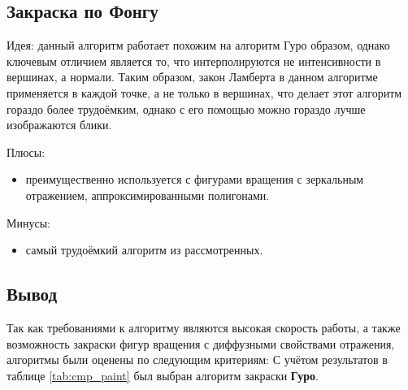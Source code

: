 \subsection{Закраска по Фонгу}
Идея: данный алгоритм работает похожим на алгоритм Гуро образом, однако
ключевым отличием является то, что интерполируются не интенсивности в вершинах,
а нормали\cite{lmodels}. Таким образом, закон Ламберта в данном алгоритме
применяется в каждой точке, а не только в вершинах, что делает этот алгоритм
гораздо более трудоёмким, однако с его помощью можно гораздо лучше изображаются
блики.

Плюсы:
\begin{itemize}
    \item преимущественно используется с фигурами вращения с зеркальным
        отражением, аппроксимированными полигонами.
\end{itemize}

Минусы:
\begin{itemize}
    \item самый трудоёмкий алгоритм из рассмотренных\cite{rogers}.
\end{itemize}

\subsection*{Вывод}

 Так как требованиями к алгоритму являются высокая скорость работы, а также
 возможность закраски фигур вращения с диффузными свойствами отражения,
 алгоритмы были оценены по следующим критериям: С учётом результатов в таблице
 \ref{tab:cmp_paint} был выбран алгоритм закраски \textbf{Гуро}.
